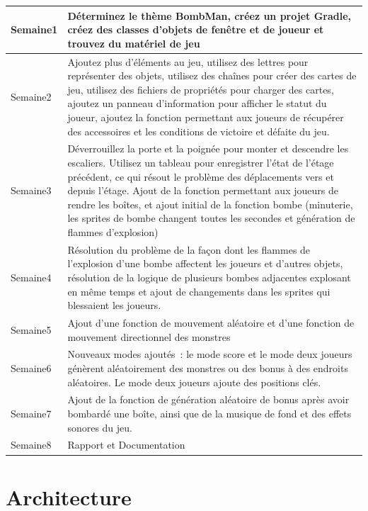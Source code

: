 \documentclass[11pt,english]{article}
\begin{document}
\begin{table}[H]
    \centering
    \begin{tabular}{|p{}|p{}|}
    \hline
    Semaine1 & Déterminez le thème BombMan, créez un projet Gradle, créez des classes d'objets de fenêtre et de joueur et trouvez du matériel de jeu\\
    \hline
    Semaine2 & Ajoutez plus d'éléments au jeu, utilisez des lettres pour représenter des objets, utilisez des chaînes pour créer des cartes de jeu, utilisez des fichiers de propriétés pour charger des cartes, ajoutez un panneau d'information pour afficher le statut du joueur, ajoutez la fonction permettant aux joueurs de récupérer des accessoires et les conditions de victoire et défaite du jeu. \\
    \hline
    Semaine3 & Déverrouillez la porte et la poignée pour monter et descendre les escaliers. Utilisez un tableau pour enregistrer l'état de l'étage précédent, ce qui résout le problème des déplacements vers et depuis l'étage. Ajout de la fonction permettant aux joueurs de rendre les boîtes, et ajout initial de la fonction bombe (minuterie, les sprites de bombe changent toutes les secondes et génération de flammes d'explosion)\\
    \hline
    Semaine4 & Résolution du problème de la façon dont les flammes de l'explosion d'une bombe affectent les joueurs et d'autres objets, résolution de la logique de plusieurs bombes adjacentes explosant en même temps et ajout de changements dans les sprites qui blessaient les joueurs.\\
    \hline
    Semaine5 & Ajout d'une fonction de mouvement aléatoire et d'une fonction de mouvement directionnel des monstres \\
    \hline
    Semaine6 & Nouveaux modes ajoutés : le mode score et le mode deux joueurs génèrent aléatoirement des monstres ou des bonus à des endroits aléatoires. Le mode deux joueurs ajoute des positions clés. \\
    \hline
    Semaine7 & Ajout de la fonction de génération aléatoire de bonus après avoir bombardé une boîte, ainsi que de la musique de fond et des effets sonores du jeu. \\
    \hline
    Semaine8 & Rapport et Documentation \\
    \hline
    \end{tabular}
\end{table}
  

\section{Architecture}
\end{document}
